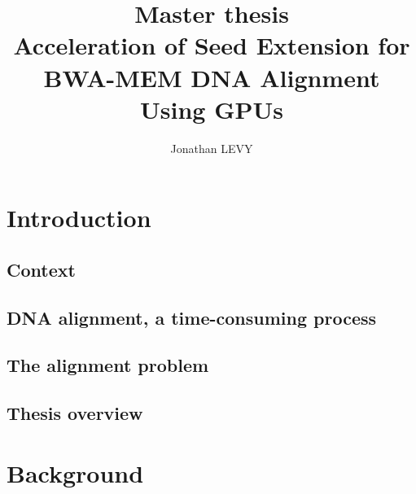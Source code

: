 \documentclass[11pt,a4paper]{report}
\author{Jonathan LEVY}
\title{Master thesis \\Acceleration of Seed Extension for BWA-MEM DNA Alignment Using GPUs}
\begin{document}
	\maketitle
	
	\begin{abstract}
		
	\end{abstract}

	\renewcommand{\abstractname}{Acknowledgements}
	\begin{abstract}
		
	\end{abstract}

	
	\tableofcontents
	
	\chapter{Introduction}
	\label{chap:intro}
	
	
		\section{Context}
		
		
		\section{DNA alignment, a time-consuming process}
		
		
		\section{The alignment problem}
		
	
		\section{Thesis overview}
		
		
	\chapter{Background}
	\label{chap:background}
\end{document}
